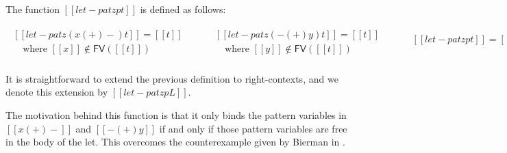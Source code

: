 \begin{definition}
  \label{def:let-pat-term}
  The function $[[let-pat z p t]]$ is defined as follows:
  \begin{center}
    \begin{math}
      \begin{array}{lllllllll}      
        \begin{array}{lll}
          [[let-pat z (x (+) -) t]] = [[t]]\\
          \,\,\,\,\,\,\text{where } [[x]] \not\in \mathsf{FV}([[t]])\\
        \end{array}
        & \quad &
          \begin{array}{lll}
            [[let-pat z (- (+) y) t]] = [[t]]\\
        \,\,\,\,\,\,\text{where } [[y]] \not\in \mathsf{FV}([[t]])\\
          \end{array}
        & \quad &
          \begin{array}{lll}
            [[let-pat z p t]] = [[let z be p in t]]\\
            & \\
          \end{array}
      \end{array}
    \end{math}
  \end{center}
  It is straightforward to extend the previous definition to
  right-contexts, and we denote this extension by $[[let-pat z p L]]$.
\end{definition}
The motivation behind this function is that it only binds the pattern
variables in $[[x (+) -]]$ and $[[- (+) y]]$ if and only if those
pattern variables are free in the body of the let.  This overcomes the
counterexample given by Bierman in \cite{Bierman:1996}.  

